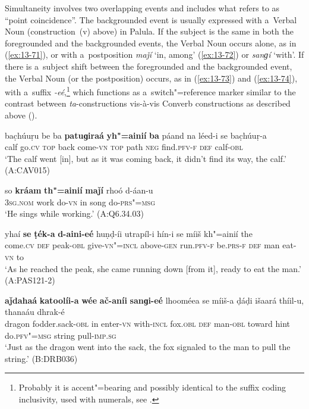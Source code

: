  Simultaneity involves two overlapping events and includes what
\citet[330]{givon2001b} refers to as ``point coincidence''. The backgrounded event
\citep[254--255]{thompsonetal2007} is usually expressed with a~Verbal Noun (construction~(v) above) in
Palula. If the subject is the same in both the foregrounded and the backgrounded events, the
Verbal Noun occurs alone, as in (\ref{ex:13-71}), or with a~postposition \textit{maǰí} `in,
among' (\ref{ex:13-72}) or \textit{sanɡí} `with'. If there is a~subject shift between
the foregrounded and the backgrounded event, the Verbal Noun (or the postposition) occurs, as in
(\ref{ex:13-73}) and (\ref{ex:13-74}), with a~suffix \textit{-eé},\footnote{Probably it is accent"=bearing and possibly identical to the suffix coding inclusivity, used with numerals, see .} which functions as a~switch"=reference marker similar to the contrast between
\textit{ta}-constructions vis-à-vis Converb constructions as described above ().

\begin{exe}
\ex
\label{ex:13-71}
\gll bac̣húuṛu be ba \textbf{patuɡiraá} \textbf{yh"=ainií} \textbf{ba} páand na léed-i se bac̣húuṛ-a \\
calf go.\textsc{cv} \textsc{top} back come-\textsc{vn }  \textsc{top} path \textsc{neg} find.\textsc{pfv-f} \textsc{def} calf-\textsc{obl}  \\
\glt `The calf went [in], but as it was coming back, it didn't find its way, the calf.' (A:CAV015)

\ex
\label{ex:13-72}
\gll so \textbf{kráam} \textbf{th"=ainií} \textbf{maǰí} rhoó d-áan-u  \\
\textsc{3sg.nom} work do-\textsc{vn} in song do-\textsc{prs"=msg}  \\
\glt `He sings while working.' (A:Q6.34.03)

\ex
\label{ex:13-73}
\gll yhaí \textbf{se} \textbf{ṭék-a} \textbf{d-aini-eé} huṇḍ-íi utrapíl-i hín-i se míiš kh"=ainií the \\
come.\textsc{cv} \textsc{def} peak-\textsc{obl} give-\textsc{vn"=incl} above-\textsc{gen} run.\textsc{pfv-f}  be.\textsc{prs-f } \textsc{def} man eat-\textsc{vn} to  \\
\glt `As he reached the peak, she came running down [from it], ready to eat the man.' (A:PAS121-2)

\ex
\label{ex:13-74}
\gll \textbf{aǰdahaá} \textbf{katoolíi-a} \textbf{wée} \textbf{ač-aníi} \textbf{sanɡi-eé} lhooméea se míiš-a ḍáḍi išaará thíil-u, thanaáu dhrak-é \\
dragon fodder.sack-\textsc{obl} in enter-\textsc{vn} with-\textsc{incl}  fox.\textsc{obl} \textsc{def} man-\textsc{obl} toward hint do.\textsc{pfv"=msg} string pull-\textsc{imp.sg}  \\
\glt `Just as the dragon went into the sack, the fox signaled to the man to pull the string.' (B:DRB036)
\end{exe}

